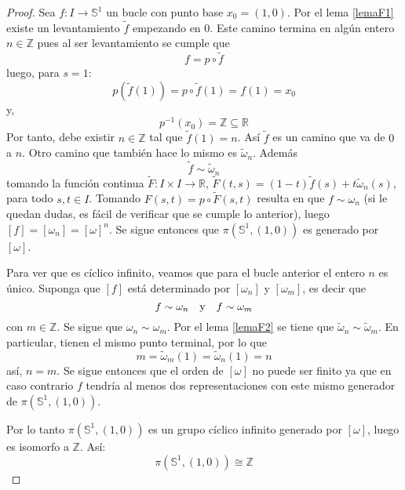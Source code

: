 \documentclass{article}
\newcounter{it}
\theoremstyle{largebreak}
\newcommand\cf[3]{\ensuremath{#1:#2\rightarrow#3}}
\begin{document}
    \begin{proof}
        Sea $\cf{f}{I}{\mathbb{S}^1}$ un bucle con punto base $x_0=(1,0)$. Por el lema \ref{lemaF1} existe un levantamiento $\widetilde{f}$ empezando en $0$. Este camino termina en algún entero $n\in\mathbb{Z}$ pues al ser levantamiento se cumple que
        \begin{equation*}
            f = p\circ \widetilde{f}
        \end{equation*}
        luego, para $s=1$:
        \begin{equation*}
            p(\widetilde{f}(1))=p\circ\widetilde{f}(1)=f(1)=x_0
        \end{equation*}
        y,
        \begin{equation*}
            p^{-1}(x_0)=\mathbb{Z}\subseteq\mathbb{R}
        \end{equation*}
        Por tanto, debe existir $n\in\mathbb{Z}$ tal que $\widetilde{f}(1)=n$. Así $\widetilde{f}$ es un camino que va de $0$ a $n$. Otro camino que también hace lo mismo es $\widetilde{\omega}_n$. Además
        \begin{equation*}
            \widetilde{f}\sim \widetilde{\omega}_n
        \end{equation*}
        tomando la función continua $\cf{\widetilde{F}}{I\times I}{\mathbb{R}}$, $\widetilde{F}(t,s)=(1-t)\widetilde{f}(s)+t\widetilde{\omega}_n(s)$, para todo $s,t\in I$. Tomando $F(s,t)=p\circ \widetilde{F}(s,t)$ resulta en que $f\sim\omega_n$ (si le quedan dudas, es fácil de verificar que se cumple lo anterior), luego $[f]=[\omega_n]=[\omega]^n$. Se sigue entonces que $\pi(\mathbb{S}^1,(1,0))$ es generado por $[\omega]$.

        Para ver que es cíclico infinito, veamos que para el bucle anterior el entero $n$ es único. Suponga que $[f]$ está determinado por $[\omega_n]$ y $[\omega_m]$, es decir que
        \begin{equation*}
            f\sim\omega_n\quad\textup{y}\quad f\sim\omega_m
        \end{equation*}
        con $m\in\mathbb{Z}$. Se sigue que $\omega_n\sim\omega_m$. Por el lema \ref{lemaF2} se tiene que $\widetilde{\omega}_n\sim\widetilde{\omega}_m$. En particular, tienen el mismo punto terminal, por lo que
        \begin{equation*}
            m=\widetilde{\omega}_m(1)=\widetilde{\omega}_n(1)=n
        \end{equation*}
        así, $n=m$. Se sigue entonces que el orden de $[\omega]$ no puede ser finito ya que en caso contrario $f$ tendría al menos dos representaciones con este mismo generador de $\pi(\mathbb{S}^1,(1,0))$.

        Por lo tanto $\pi(\mathbb{S}^1,(1,0))$ es un grupo cíclico infinito generado por $[\omega]$, luego es isomorfo a $\mathbb{Z}$. Así:
        \begin{equation*}
            \pi(\mathbb{S}^1,(1,0))\cong\mathbb{Z}
        \end{equation*}
    \end{proof}
\end{document}
